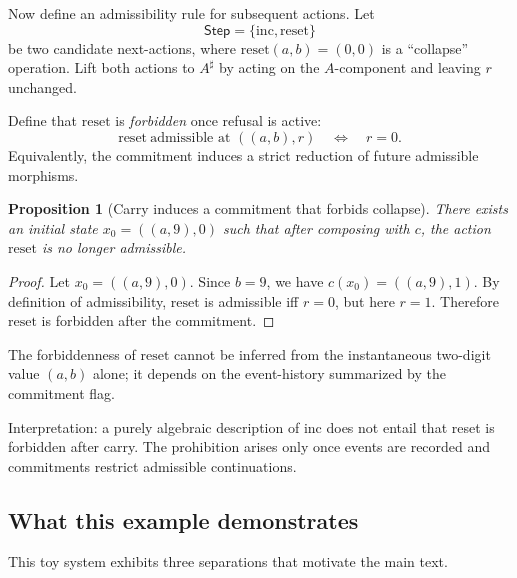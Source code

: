 \documentclass[11pt]{article}
\newtheorem{proposition}{Proposition}
\begin{document}
Now define an admissibility rule for subsequent actions. Let
\[
\mathsf{Step}=\{\mathrm{inc},\mathrm{reset}\}
\]
be two candidate next-actions, where $\mathrm{reset}(a,b)=(0,0)$ is a ``collapse''
operation. Lift both actions to $A^\sharp$ by acting on the $A$-component and
leaving $r$ unchanged.

Define that $\mathrm{reset}$ is \emph{forbidden} once refusal is active:
\[
\mathrm{reset}\ \text{admissible at }((a,b),r)
\quad \Longleftrightarrow \quad r=0.
\]
Equivalently, the commitment induces a strict reduction of future admissible
morphisms.

\begin{proposition}[Carry induces a commitment that forbids collapse]
There exists an initial state $x_0=((a,9),0)$ such that after composing with $c$,
the action $\mathrm{reset}$ is no longer admissible.
\end{proposition}

\begin{proof}
Let $x_0=((a,9),0)$. Since $b=9$, we have $c(x_0)=((a,9),1)$. By definition of
admissibility, $\mathrm{reset}$ is admissible iff $r=0$, but here $r=1$.
Therefore $\mathrm{reset}$ is forbidden after the commitment.
\end{proof}

\begin{corollary}
The forbiddenness of $\mathrm{reset}$ cannot be inferred from the instantaneous
two-digit value $(a,b)$ alone; it depends on the event-history summarized by the
commitment flag.
\end{corollary}

\noindent
Interpretation: a purely algebraic description of $\mathrm{inc}$ does not entail
that reset is forbidden after carry. The prohibition arises only once events are
recorded and commitments restrict admissible continuations.

\subsection{What this example demonstrates}

This toy system exhibits three separations that motivate the main text.
\end{document}
